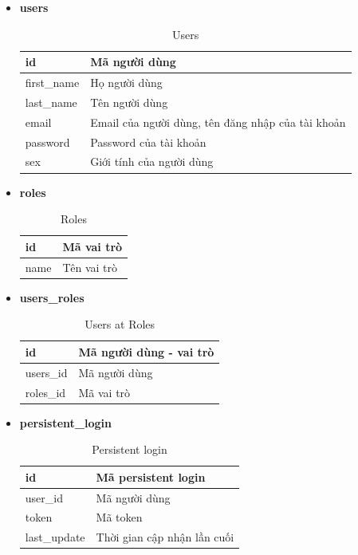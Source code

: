 \begin{itemize}
    \item \textbf{users}
    \begin{table}[H]
        \centering
        \begin{tabular}{|m{3cm}|m{10cm}|}
        \hline 
            id & Mã người dùng\\ \hline
            first\_name & Họ người dùng \\ \hline
            last\_name & Tên người dùng\\ \hline
            email & Email của người dùng, tên đăng nhập của tài khoản \\ \hline
            password & Password của tài khoản\\ \hline
            sex & Giới tính của người dùng\\
        \hline 
        \end{tabular}
        \caption{Users}
        \label{users}
    \end{table}
    
    \newpage
    \item \textbf{roles}
    \begin{table}[H]
        \centering
        \begin{tabular}{|m{3cm}|m{10cm}|}
        \hline 
            id & Mã vai trò\\ \hline
            name & Tên vai trò\\
        \hline 
        \end{tabular}
        \caption{Roles}
        \label{roles}
    \end{table}
    
    \item \textbf{users\_roles}
    \begin{table}[H]
        \centering
        \begin{tabular}{|m{3cm}|m{10cm}|}
        \hline 
            id & Mã người dùng - vai trò\\ \hline
            users\_id & Mã người dùng\\ \hline
            roles\_id & Mã vai trò\\
        \hline 
        \end{tabular}
        \caption{Users at Roles}
        \label{users_roles}
    \end{table}
    
    \item \textbf{persistent\_login}
    \begin{table}[H]
        \centering
        \begin{tabular}{|m{3cm}|m{10cm}|}
        \hline 
            id & Mã persistent login\\ \hline
            user\_id & Mã người dùng\\ \hline
            token & Mã token\\ \hline
            last\_update & Thời gian cập nhận lần cuối\\
        \hline 
        \end{tabular}
        \caption{Persistent login}
        \label{persistent_login}
    \end{table}
    

\end{itemize}
